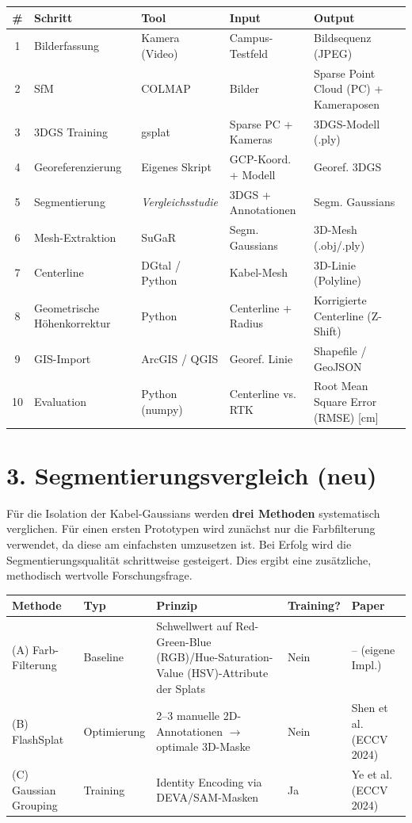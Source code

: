 \documentclass[11pt, a4paper]{article}
\begin{document}
\begin{center}
\small
\begin{tabular}{|c|p{2.8cm}|p{3cm}|p{3.5cm}|p{3.5cm}|}
\hline
\textbf{\#} & \textbf{Schritt} & \textbf{Tool} & \textbf{Input} & \textbf{Output} \\
\hline
1 & Bilderfassung & Kamera (Video) & Campus-Testfeld & Bildsequenz (JPEG) \\
\hline
2 & SfM & COLMAP & Bilder & Sparse Point Cloud (PC) + Kameraposen \\
\hline
3 & 3DGS Training & gsplat & Sparse PC + Kameras & 3DGS-Modell (.ply) \\
\hline
4 & Georeferenzierung & Eigenes Skript & GCP-Koord. + Modell & Georef. 3DGS \\
\hline
5 & Segmentierung & \textit{Vergleichsstudie} & 3DGS + Annotationen & Segm. Gaussians \\
\hline
6 & Mesh-Extraktion & SuGaR & Segm. Gaussians & 3D-Mesh (.obj/.ply) \\
\hline
7 & Centerline & DGtal / Python & Kabel-Mesh & 3D-Linie (Polyline) \\
\hline
8 & Geometrische H\"ohenkorrektur & Python & Centerline + Radius & Korrigierte Centerline (Z-Shift) \\
\hline
9 & GIS-Import & ArcGIS / QGIS & Georef. Linie & Shapefile / GeoJSON \\
\hline
10 & Evaluation & Python (numpy) & Centerline vs. RTK & Root Mean Square Error (RMSE) [cm] \\
\hline
\end{tabular}
\end{center}

\section{3. Segmentierungsvergleich (neu)}

F\"ur die Isolation der Kabel-Gaussians werden \textbf{drei Methoden} systematisch verglichen. F\"ur einen ersten Prototypen wird zun\"achst nur die Farbfilterung verwendet, da diese am einfachsten umzusetzen ist. Bei Erfolg wird die Segmentierungsqualit\"at schrittweise gesteigert. Dies ergibt eine zus\"atzliche, methodisch wertvolle Forschungsfrage.

\begin{center}
\small
\begin{tabular}{|p{2.5cm}|p{2.5cm}|p{3cm}|p{2cm}|p{2.5cm}|}
\hline
\textbf{Methode} & \textbf{Typ} & \textbf{Prinzip} & \textbf{Training?} & \textbf{Paper} \\
\hline
(A) Farb-Filterung & Baseline & Schwellwert auf Red-Green-Blue (RGB)/Hue-Saturation-Value (HSV)-Attribute der Splats & Nein & -- (eigene Impl.) \\
\hline
(B) FlashSplat & Optimierung & 2--3 manuelle 2D-Annotationen $\rightarrow$ optimale 3D-Maske & Nein & Shen et al. (ECCV 2024) \\
\hline
(C) Gaussian Grouping & Training & Identity Encoding via DEVA/SAM-Masken & Ja & Ye et al. (ECCV 2024) \\
\hline
\end{tabular}
\end{center}
\end{document}
